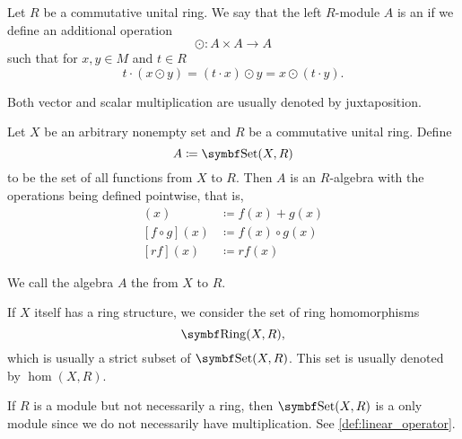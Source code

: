 \begin{definition}\label{def:algebra_over_ring}\cite[4]{Kocev2016}
  Let \( R \) be a commutative unital ring. We say that the left \( R \)-module \( A \) is an  if we define an additional  operation
  \begin{equation*}
    \odot: A \times A \to A
  \end{equation*}
  such that for \( x, y \in M \) and \( t \in R \)
  \begin{equation*}
    t \cdot (x \odot y) = (t \cdot x) \odot y = x \odot (t \cdot y).
  \end{equation*}

   Both vector and scalar multiplication are usually denoted by juxtaposition.
\end{definition}

\begin{proposition}\label{thm:functions_over_ring_form_algebra}
  Let \( X \) be an arbitrary nonempty set and \( R \) be a commutative unital ring. Define
  \begin{equation*}
    A \coloneqq \Cat{Set}(X, R)
  \end{equation*}
  to be the set of all functions from \( X \) to \( R \). Then \( A \) is an \( R \)-algebra with the operations being defined pointwise, that is,
  \begin{align*}
    [f + g](x) &\coloneqq f(x) + g(x) \\
    [f \circ g](x) &\coloneqq f(x) \circ g(x) \\
    [rf](x) &\coloneqq r f(x) 
  \end{align*}

  We call the algebra \( A \) the  from \( X \) to \( R \).

  If \( X \) itself has a ring structure, we consider the set of ring homomorphisms
  \begin{equation*}
    \Cat{Ring}(X, R),
  \end{equation*}
  which is usually a strict subset of \( \Cat{Set}(X, R) \). This set is usually denoted by \( \hom(X, R) \).

  If \( R \) is a module but not necessarily a ring, then \( \Cat{Set}(X, R) \) is a only module since we do not necessarily have multiplication. See \cref{def:linear_operator}.
\end{proposition}
